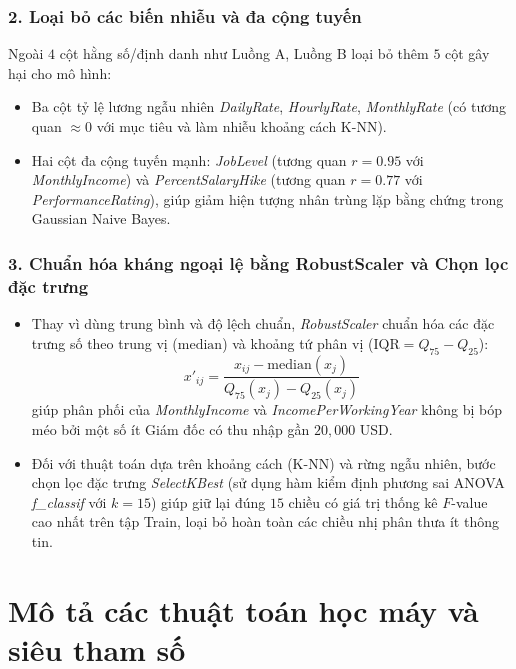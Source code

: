 \subsubsection{2. Loại bỏ các biến nhiễu và đa cộng tuyến}
Ngoài $4$ cột hằng số/định danh như Luồng A, Luồng B loại bỏ thêm $5$ cột gây hại cho mô hình:
\begin{itemize}
    \item Ba cột tỷ lệ lương ngẫu nhiên \textit{DailyRate}, \textit{HourlyRate}, \textit{MonthlyRate} (có tương quan $\approx 0$ với mục tiêu và làm nhiễu khoảng cách K-NN).
    \item Hai cột đa cộng tuyến mạnh: \textit{JobLevel} (tương quan $r = 0.95$ với \textit{MonthlyIncome}) và \textit{PercentSalaryHike} (tương quan $r = 0.77$ với \textit{PerformanceRating}), giúp giảm hiện tượng nhân trùng lặp bằng chứng trong Gaussian Naive Bayes.
\end{itemize}

\subsubsection{3. Chuẩn hóa kháng ngoại lệ bằng RobustScaler và Chọn lọc đặc trưng}
\begin{itemize}
    \item Thay vì dùng trung bình và độ lệch chuẩn, \textit{RobustScaler} chuẩn hóa các đặc trưng số theo trung vị ($\text{median}$) và khoảng tứ phân vị ($\text{IQR} = Q_{75} - Q_{25}$):
    \[
        x'_{ij} = \frac{x_{ij} - \text{median}(x_j)}{Q_{75}(x_j) - Q_{25}(x_j)}
    \]
    giúp phân phối của \textit{MonthlyIncome} và \textit{IncomePerWorkingYear} không bị bóp méo bởi một số ít Giám đốc có thu nhập gần $20,000$ USD.
    \item Đối với thuật toán dựa trên khoảng cách (K-NN) và rừng ngẫu nhiên, bước chọn lọc đặc trưng \textit{SelectKBest} (sử dụng hàm kiểm định phương sai ANOVA \textit{f\_classif} với $k = 15$) giúp giữ lại đúng $15$ chiều có giá trị thống kê $F$-value cao nhất trên tập Train, loại bỏ hoàn toàn các chiều nhị phân thưa ít thông tin.
\end{itemize}

\section{Mô tả các thuật toán học máy và siêu tham số}

